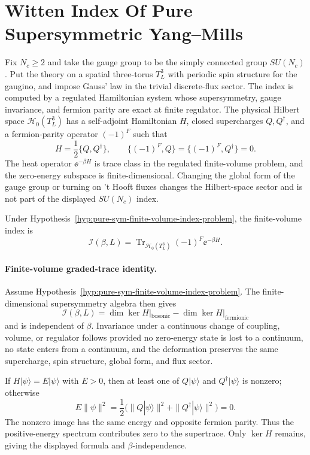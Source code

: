 \section{Witten Index Of Pure Supersymmetric Yang--Mills}

\begin{hypothesis}
\label{hyp:pure-sym-finite-volume-index-problem}
Fix \(N_c\geq2\) and take the gauge group to be the simply connected group
\(SU(N_c)\).  Put the theory on a spatial three-torus \(T^3_L\) with
periodic spin structure for the gaugino, and impose Gauss' law in the
trivial discrete-flux sector.  The index is computed by a regulated
Hamiltonian system whose supersymmetry, gauge invariance, and fermion parity
are exact at finite regulator.  The physical Hilbert space
\(\mathcal H_0(T^3_L)\) has a self-adjoint Hamiltonian \(H\), closed
supercharges \(Q,Q^\dagger\), and a fermion-parity operator \((-1)^F\) such
that
\[
  H=\frac12\{Q,Q^\dagger\},
  \qquad
  \{(-1)^F,Q\}=\{(-1)^F,Q^\dagger\}=0 .
\]
The heat operator \(\ee^{-\beta H}\) is trace class in the regulated
finite-volume problem, and the zero-energy subspace is finite-dimensional.
Changing the global form of the gauge group or turning on 't Hooft fluxes
changes the Hilbert-space sector and is not part of the displayed
\(SU(N_c)\) index.
\end{hypothesis}

Under Hypothesis~\ref{hyp:pure-sym-finite-volume-index-problem}, the
finite-volume index is
\[
  \mathcal I(\beta,L)
  =
  \operatorname{Tr}_{\mathcal H_0(T^3_L)}
  (-1)^F\ee^{-\beta H}.
\]

\paragraph{Finite-volume graded-trace identity.}
Assume Hypothesis~\ref{hyp:pure-sym-finite-volume-index-problem}.  The
finite-dimensional supersymmetry algebra then gives
\[
  \mathcal I(\beta,L)
  =
  \dim\ker H|_{\mathrm{bosonic}}
  -
  \dim\ker H|_{\mathrm{fermionic}}
\]
and is independent of \(\beta\).  Invariance under a continuous change of
coupling, volume, or regulator follows provided no zero-energy state is lost
to a continuum, no state enters from a continuum, and the deformation
preserves the same supercharge, spin structure, global form, and flux sector.

If \(H|\psi\rangle=E|\psi\rangle\) with \(E>0\), then at least one of
\(Q|\psi\rangle\) and \(Q^\dagger|\psi\rangle\) is nonzero; otherwise
\[
  E\|\psi\|^2
  =
  \frac12\bigl(\|Q|\psi\rangle\|^2+\|Q^\dagger|\psi\rangle\|^2\bigr)
  =
  0 .
\]
The nonzero image has the same energy and opposite fermion parity.  Thus the
positive-energy spectrum contributes zero to the supertrace.  Only
\(\ker H\) remains, giving the displayed formula and \(\beta\)-independence.

